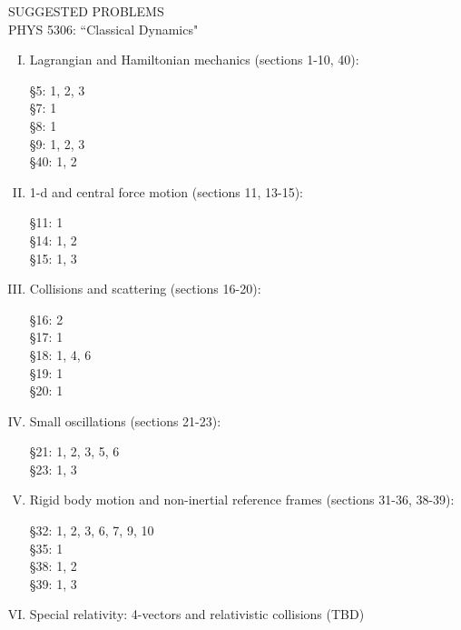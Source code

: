 \documentclass[10pt]{article}
\numberwithin{equation}{section}
\def\ben{\begin{enumerate}}
\def\een{\end{enumerate}}
\def\i{\item{}}
\begin{document}
\begin{center}
SUGGESTED PROBLEMS\\
PHYS 5306: ``Classical Dynamics"\\
\end{center}

\ben[I.]

\i Lagrangian and Hamiltonian mechanics (sections 1-10, 40):

\S 5: 1, 2, 3\\
\S 7: 1\\ 
\S 8: 1\\
\S 9: 1, 2, 3\\ 
\S 40: 1, 2

\i 1-d and central force motion (sections 11, 13-15):

\S 11: 1\\
\S 14: 1, 2\\ 
\S 15: 1, 3

\i Collisions and scattering (sections 16-20):

\S 16: 2\\
\S 17: 1\\
\S 18: 1, %
4, 6\\
\S 19: 1\\
\S 20: 1

\i Small oscillations (sections 21-23):

\S 21: 1, 2, 3, 5, 6\\
\S 23: 1, 3

\i Rigid body motion and non-inertial reference frames (sections 31-36, 38-39):

\S 32: 1, 2, 3, 6, 7, 9, 10\\
\S 35: 1\\ %
\S 38: 1, 2\\
\S 39: 1, 3

\i Special relativity: 4-vectors and relativistic collisions  (TBD)

\een
\end{document}
